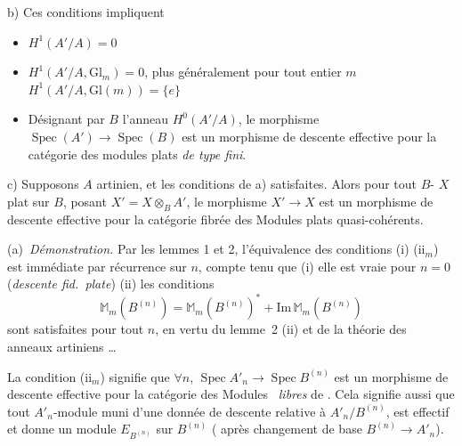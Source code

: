 \documentclass[11pt,a4paper]{article}
\begin{document}
b) Ces conditions impliquent
\begin{itemize}
  \item[(i)] $H^1(A'/A) = 0$
  \item[(ii)] $H^1(A'/A, \mathrm{Gl}_m) = 0$, plus généralement pour tout
  entier $m$ $H^1(A'/A, \mathrm{Gl}(m)) = \{e\}$
  \item[(iii)] Désignant par $B$ l'anneau $H^0(A'/A)$, le morphisme
  $\operatorname{Spec}(A') \to \operatorname{Spec}(B)$ est un morphisme de
  descente effective pour la catégorie des modules plats \emph{de type
  fini}.
\end{itemize}

c) Supposons $A$ artinien, et les conditions de a) satisfaites. Alors pour
tout $B$- $X$ plat sur $B$, posant
$X' = X \otimes_B A'$, le morphisme $X' \to X$ est un morphisme de descente
effective pour la catégorie fibrée des Modules plats quasi-cohérents.



(a)\ \emph{Démonstration.} Par les lemmes 1 et 2, l'équivalence
des conditions (i)  (ii$_m$)  est immédiate par
récurrence sur $n$, compte tenu que (i) elle est vraie pour $n = 0$
(\emph{descente fid.\ plate}) (ii) les conditions
\[
  \mathbb{M}_m(B^{(n)}) = \mathbb{M}_m(B^{(n)})^{*} + \mathrm{Im}\,\mathbb{M}_m(B^{(n)})
\]
 sont satisfaites pour tout $n$, en vertu du lemme~2 (ii)
\ill{} \ill{} et de la théorie des anneaux artiniens \ldots
{}

La condition (ii$_m$) signifie que $\forall n$,
$\operatorname{Spec} A'_n \to \operatorname{Spec} B^{(n)}$ est un
morphisme de descente effective \struck{\ill{}} pour la catégorie des
Modules \ \emph{libres} de 
. Cela signifie aussi que tout $A'_n$-module
 muni d'une donnée de descente relative à
$A'_n/B^{(n)}$, est effectif et donne un module \ill{} $E_{B^{(n)}}$ sur
$B^{(n)}$ ( \ill{} \ill{} après changement de base
$B^{(n)} \to A'_n$). \ill{} \ill{} \ill{} \ill{} \ill{} \ill{} \ill{}
\end{document}
